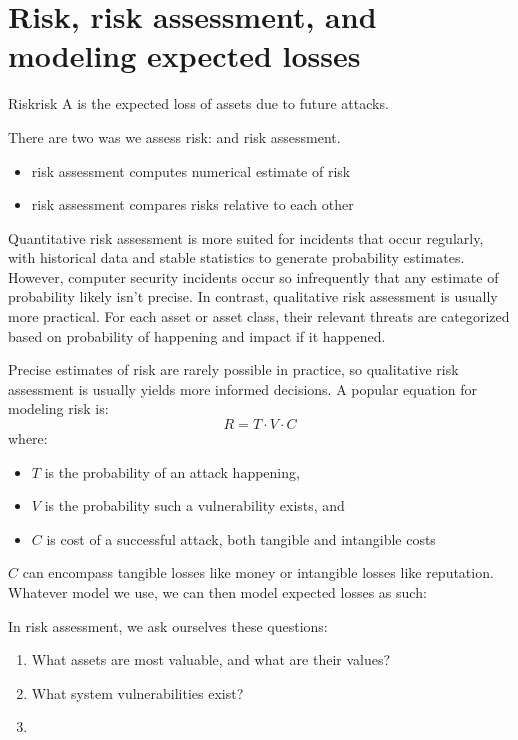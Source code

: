 \documentclass[12pt]{report}
\begin{document}
\section{Risk, risk assessment, and modeling expected losses}

\begin{dfnbox}{Risk}{risk}
    A  is the expected loss of assets due to future attacks.
\end{dfnbox}

There are two was we assess risk:  and  risk assessment.
\begin{itemize}
    \item {} risk assessment computes numerical estimate of risk
    \item {} risk assessment compares risks relative to each other
\end{itemize}

Quantitative risk assessment is more suited for incidents that occur regularly, with historical data and stable statistics to generate probability estimates. However, computer security incidents occur so infrequently that any estimate of probability likely isn't precise. In contrast, qualitative risk assessment is usually more practical. For each asset or asset class, their relevant threats are categorized based on probability of happening and impact if it happened.

Precise estimates of risk are rarely possible in practice, so qualitative risk assessment is usually yields more informed decisions. A popular equation for modeling risk is:
\[ R = T \cdot V \cdot C \]
where:
\begin{itemize}
    \item $T$ is the probability of an attack happening,
    \item $V$ is the probability such a vulnerability exists, and
    \item $C$ is cost of a successful attack, both tangible and intangible costs
\end{itemize}

$C$ can encompass tangible losses like money or intangible losses like reputation. Whatever model we use, we can then model expected losses as such:

In risk assessment, we ask ourselves these questions:
\begin{enumerate}
    \item What assets are most valuable, and what are their values?
    \item What system vulnerabilities exist?
    \item
\end{enumerate}
\end{document}
